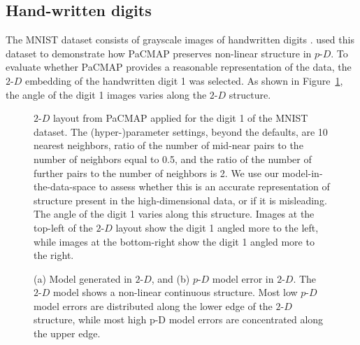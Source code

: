 \documentclass[
  12pt]{article}
\newcommand\pD{$p\text{-}D$}
\newcommand\gD{$2\text{-}D$}
\begin{document}
\subsection{Hand-written digits}\label{hand-written-digits}

The MNIST dataset consists of grayscale images of handwritten digits
\citep{lecun2010}. \citet{yingfan2021} used this dataset to demonstrate
how PaCMAP preserves non-linear structure in \pD{}. To evaluate whether
PaCMAP provides a reasonable representation of the data, the \gD{}
embedding of the handwritten digit 1 was selected. As shown in
Figure~\ref{fig-pacmap-author}, the angle of the digit 1 images varies
along the \gD{} structure.

\begin{figure}[H]


\caption{\label{fig-pacmap-author}\(2\text{-}D\) layout from PaCMAP
applied for the digit 1 of the MNIST dataset. The (hyper-)parameter
settings, beyond the defaults, are 10 nearest neighbors, ratio of the
number of mid-near pairs to the number of neighbors equal to 0.5, and
the ratio of the number of further pairs to the number of neighbors is
2. We use our model-in-the-data-space to assess whether this is an
accurate representation of structure present in the high-dimensional
data, or if it is misleading. The angle of the digit 1 varies along this
structure. Images at the top-left of the \(2\text{-}D\) layout show the
digit 1 angled more to the left, while images at the bottom-right show
the digit 1 angled more to the right.}

\end{figure}%

\begin{figure}[H]


\caption{\label{fig-model-mnist}(a) Model generated in \(2\text{-}D\),
and (b) \(p\text{-}D\) model error in \(2\text{-}D\). The \(2\text{-}D\)
model shows a non-linear continuous structure. Most low \(p\text{-}D\)
model errors are distributed along the lower edge of the \(2\text{-}D\)
structure, while most high p-D model errors are concentrated along the
upper edge.}

\end{figure}%
\end{document}
